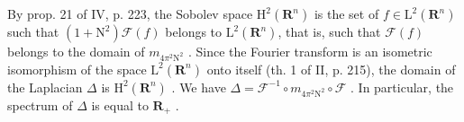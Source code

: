 By prop. 21 of IV, p. 223, the Sobolev space \(\mathrm{H}^2 (\mathbf{R}^n)\) is the set of \(f\in \mathrm{L}^2 (\mathbf{R}^n)\) such that \((1 + \mathrm{N}^2)\mathcal{F}(f)\) belongs to \(\mathrm{L}^2 (\mathbf{R}^n)\), that is, such that \(\mathcal{F}(f)\) belongs to the domain of \(m_{4\pi^2\mathrm{N}^2}\) . Since the Fourier transform is an isometric isomorphism of the space \(\mathrm{L}^2 (\mathbf{R}^n)\) onto itself (th. 1 of II, p. 215), the domain of the Laplacian \(\Delta\) is \(\mathrm{H}^2 (\mathbf{R}^n)\) . We have \(\Delta = \mathcal{F}^{-1}\circ m_{4\pi^2\mathrm{N}^2}\circ \mathcal{F}\) . In particular, the spectrum of \(\Delta\) is equal to \(\mathbf{R}_{+}\) .